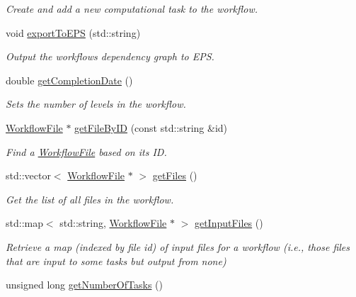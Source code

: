 \begin{DoxyCompactItemize}
\begin{DoxyCompactList}\small\item\em Create and add a new computational task to the workflow. \end{DoxyCompactList}\item 
void \hyperlink{classwrench_1_1_workflow_a73a5f2898f4fdda4cb38933c2c485b28}{export\+To\+E\+PS} (std\+::string)
\begin{DoxyCompactList}\small\item\em Output the workflow\textquotesingle{}s dependency graph to E\+PS. \end{DoxyCompactList}\item 
double \hyperlink{classwrench_1_1_workflow_ac3a1291469d2c0035352a99f0f964f3f}{get\+Completion\+Date} ()
\begin{DoxyCompactList}\small\item\em Sets the number of levels in the workflow. \end{DoxyCompactList}\item 
\hyperlink{classwrench_1_1_workflow_file}{Workflow\+File} $\ast$ \hyperlink{classwrench_1_1_workflow_a19b3b6f36f684f8c367f42a818b0a0c2}{get\+File\+By\+ID} (const std\+::string \&id)
\begin{DoxyCompactList}\small\item\em Find a \hyperlink{classwrench_1_1_workflow_file}{Workflow\+File} based on its ID. \end{DoxyCompactList}\item 
std\+::vector$<$ \hyperlink{classwrench_1_1_workflow_file}{Workflow\+File} $\ast$ $>$ \hyperlink{classwrench_1_1_workflow_ab6754d68d09294e56aaffbe75c891369}{get\+Files} ()
\begin{DoxyCompactList}\small\item\em Get the list of all files in the workflow. \end{DoxyCompactList}\item 
std\+::map$<$ std\+::string, \hyperlink{classwrench_1_1_workflow_file}{Workflow\+File} $\ast$ $>$ \hyperlink{classwrench_1_1_workflow_aa0b88cee8316ed20def3010c92a6d69c}{get\+Input\+Files} ()
\begin{DoxyCompactList}\small\item\em Retrieve a map (indexed by file id) of input files for a workflow (i.\+e., those files that are input to some tasks but output from none) \end{DoxyCompactList}\item 
unsigned long \hyperlink{classwrench_1_1_workflow_ab2b98a21d67824c2fc17cdc71c7e3909}{get\+Number\+Of\+Tasks} ()

\end{DoxyCompactItemize}
